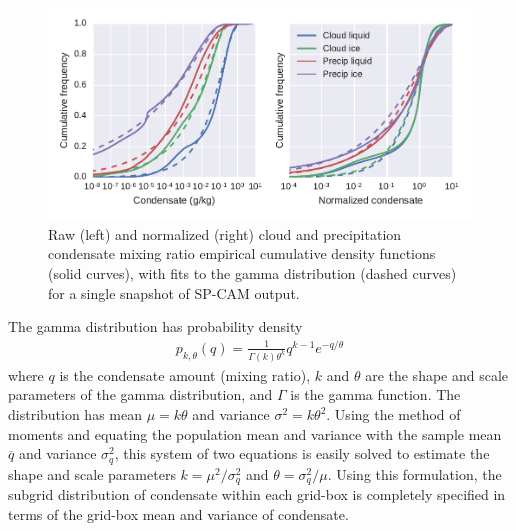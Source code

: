 \begin{figure}[htbp]
\centering
\includegraphics{graphics/subgrid2_mxratio_cdf1.pdf}
\caption{\label{fig:mxratioCDF}Raw (left) and normalized (right) cloud
and precipitation condensate mixing ratio empirical cumulative density
functions (solid curves), with fits to the gamma distribution (dashed
curves) for a single snapshot of SP-CAM output.}\label{fig:mxratioCDF}
\end{figure}

The gamma distribution has probability density \[\begin{gathered} 
    p_{k, \theta}(q) 
        = \frac{1}{\Gamma(k) \theta^k} q^{k - 1} e^{-q/\theta}
\end{gathered}\] where \(q\) is the condensate amount (mixing ratio),
\(k\) and \(\theta\) are the shape and scale parameters of the gamma
distribution, and \(\Gamma\) is the gamma function. The distribution has
mean \(\mu = k\theta\) and variance \(\sigma^2 = k \theta^2\). Using the
method of moments \citep[e.g.,][]{wilks_2011} and equating the
population mean and variance with the sample mean \(\overline{q}\) and
variance \(\sigma_q^2\), this system of two equations is easily solved
to estimate the shape and scale parameters \(k = \mu^2 / \sigma_q^2\)
and \(\theta = \sigma_q^2 / \mu\). Using this formulation, the subgrid
distribution of condensate within each grid-box is completely specified
in terms of the grid-box mean and variance of condensate.

